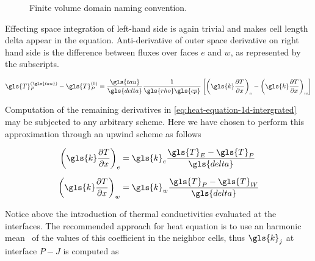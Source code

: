 \documentclass[12pt]{article}%
\begin{document}
\begin{figure}[ht!]
\centering
{}
\caption{\label{fig:fvm-naming}Finite volume domain naming convention.}
\end{figure}


Effecting space integration of left-hand side is again trivial and makes cell length \gls{delta} appear in the equation. Anti-derivative of outer space derivative on right hand side is the difference between fluxes over faces $e$ and $w$, as represented by the subscripts.

\begin{equation}
\gls{T}^{(\gls{tau})}_{P} - \gls{T}^{(0)}_{P} =
\frac{\gls{tau}}{\gls{delta}}\frac{1}{\gls{rho}\gls{cp}}
\left[
	\left(\gls{k}\partialdiff{T}{x}\right)_{e} -
	\left(\gls{k}\partialdiff{T}{x}\right)_{w}
\right]
\label{eq:heat-equation-1d-intergrated}
\end{equation}

Computation of the remaining derivatives in \eqref{eq:heat-equation-1d-intergrated} may be subjected to any arbitrary scheme. Here we have chosen to perform this approximation through an upwind scheme as follows

\begin{align}
\left(\gls{k}\partialdiff{T}{x}\right)_{e} &=
\gls{k}_{e}\frac{\gls{T}_{E} - \gls{T}_{P}}{\gls{delta}}\\[6pt]
\left(\gls{k}\partialdiff{T}{x}\right)_{w} &=
\gls{k}_{w}\frac{\gls{T}_{P} - \gls{T}_{W}}{\gls{delta}}
\end{align}

Notice above the introduction of thermal conductivities evaluated at the interfaces. The recommended approach for heat equation is to use an harmonic mean~\cite{Patankar1980} of the values of this coefficient in the neighbor cells, thus $\gls{k}_{j}$ at interface $P-J$ is computed as
\end{document}
